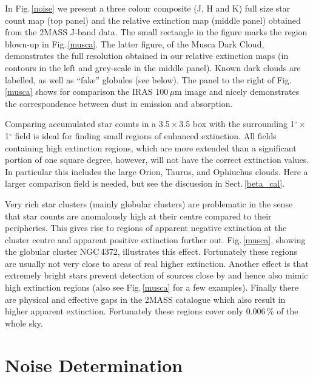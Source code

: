\documentclass{aa}
\begin{document}
In Fig.\,\ref{noise} we present a three colour composite (J, H and K) full size
star count map (top panel) and the relative extinction map (middle panel)
obtained from the 2MASS J-band data. The small rectangle in the figure marks
the region blown-up in Fig.\,\ref{musca}. The latter figure, of the Musca Dark
Cloud, demonstrates the full resolution obtained in our relative extinction
maps (in contours in the left and grey-scale in the middle panel). Known dark
clouds are labelled, as well as ``fake'' globules (see below). The panel to the
right of Fig.\,\ref{musca} shows for comparison the IRAS 100\,$\mu$m image and
nicely demonstrates the correspondence between dust in emission and absorption.

Comparing accumulated star counts in a
3\arcmin$\!\!$.5\,$\times$\,3\arcmin$\!\!$.5 box with the surrounding
1$^\circ$\,$\times$\,1$^\circ$ field is ideal for finding small regions of
enhanced extinction. All fields containing high extinction regions, which are
more extended than a significant portion of one square degree, however, will
not have the correct extinction values. In particular this includes the large
Orion, Taurus, and Ophiuchus clouds. Here a larger comparison field is needed,
but see the discussion in Sect.\,\ref{beta_cal}. 

Very rich star clusters (mainly globular clusters) are problematic in the sense
that star counts are anomalously  high at their centre compared to their
peripheries. This gives rise to regions of apparent negative extinction at the
cluster centre and apparent positive extinction further out. 
Fig.\,\ref{musca}, showing the globular cluster NGC\,4372, illustrates this
effect. Fortunately these regions are usually not very close to areas of real
higher extinction.  Another effect is that extremely bright stars prevent
detection of sources close by and hence also mimic  high extinction regions
(also see Fig.\,\ref{musca} for a few examples). Finally there are physical and
effective gaps in the 2MASS catalogue which also result in higher apparent
extinction. Fortunately these regions cover only 0.006\,\% of the whole sky.

\section{Noise Determination}
\end{document}
